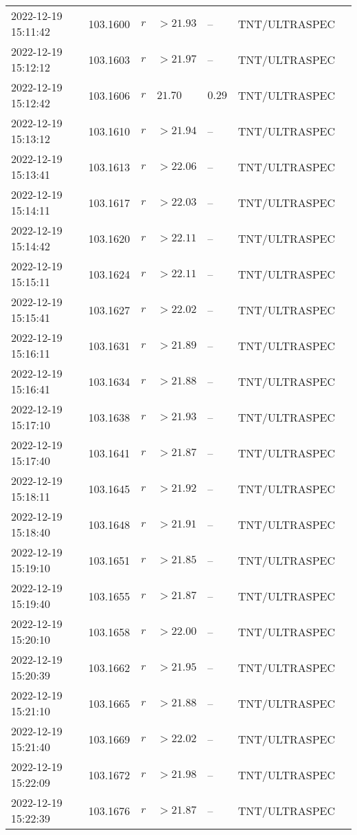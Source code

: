 \documentclass{nature_plusfigure}
\begin{document}
\begin{supplement}
\begin{center}
\begin{longtable}{lllllll}
2022-12-19 15:11:42 & 103.1600 & $r$ & $>21.93$ & -- & TNT/ULTRASPEC &  \\ 
2022-12-19 15:12:12 & 103.1603 & $r$ & $>21.97$ & -- & TNT/ULTRASPEC &  \\ 
2022-12-19 15:12:42 & 103.1606 & $r$ & $21.70$ & $0.29$ & TNT/ULTRASPEC &  \\ 
2022-12-19 15:13:12 & 103.1610 & $r$ & $>21.94$ & -- & TNT/ULTRASPEC &  \\ 
2022-12-19 15:13:41 & 103.1613 & $r$ & $>22.06$ & -- & TNT/ULTRASPEC &  \\ 
2022-12-19 15:14:11 & 103.1617 & $r$ & $>22.03$ & -- & TNT/ULTRASPEC &  \\ 
2022-12-19 15:14:42 & 103.1620 & $r$ & $>22.11$ & -- & TNT/ULTRASPEC &  \\ 
2022-12-19 15:15:11 & 103.1624 & $r$ & $>22.11$ & -- & TNT/ULTRASPEC &  \\ 
2022-12-19 15:15:41 & 103.1627 & $r$ & $>22.02$ & -- & TNT/ULTRASPEC &  \\ 
2022-12-19 15:16:11 & 103.1631 & $r$ & $>21.89$ & -- & TNT/ULTRASPEC &  \\ 
2022-12-19 15:16:41 & 103.1634 & $r$ & $>21.88$ & -- & TNT/ULTRASPEC &  \\ 
2022-12-19 15:17:10 & 103.1638 & $r$ & $>21.93$ & -- & TNT/ULTRASPEC &  \\ 
2022-12-19 15:17:40 & 103.1641 & $r$ & $>21.87$ & -- & TNT/ULTRASPEC &  \\ 
2022-12-19 15:18:11 & 103.1645 & $r$ & $>21.92$ & -- & TNT/ULTRASPEC &  \\ 
2022-12-19 15:18:40 & 103.1648 & $r$ & $>21.91$ & -- & TNT/ULTRASPEC &  \\ 
2022-12-19 15:19:10 & 103.1651 & $r$ & $>21.85$ & -- & TNT/ULTRASPEC &  \\ 
2022-12-19 15:19:40 & 103.1655 & $r$ & $>21.87$ & -- & TNT/ULTRASPEC &  \\ 
2022-12-19 15:20:10 & 103.1658 & $r$ & $>22.00$ & -- & TNT/ULTRASPEC &  \\ 
2022-12-19 15:20:39 & 103.1662 & $r$ & $>21.95$ & -- & TNT/ULTRASPEC &  \\ 
2022-12-19 15:21:10 & 103.1665 & $r$ & $>21.88$ & -- & TNT/ULTRASPEC &  \\ 
2022-12-19 15:21:40 & 103.1669 & $r$ & $>22.02$ & -- & TNT/ULTRASPEC &  \\ 
2022-12-19 15:22:09 & 103.1672 & $r$ & $>21.98$ & -- & TNT/ULTRASPEC &  \\ 
2022-12-19 15:22:39 & 103.1676 & $r$ & $>21.87$ & -- & TNT/ULTRASPEC &  \\ 

\end{longtable}
\end{center}
\end{supplement}
\end{document}
